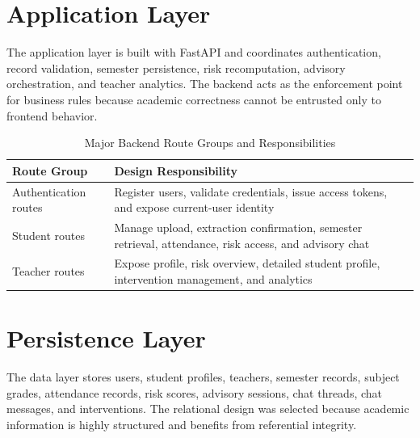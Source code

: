 \section{Application Layer}
The application layer is built with FastAPI and coordinates authentication, record validation, semester persistence, risk recomputation, advisory orchestration, and teacher analytics. The backend acts as the enforcement point for business rules because academic correctness cannot be entrusted only to frontend behavior.

\begin{table}[H]
\centering
\caption{Major Backend Route Groups and Responsibilities}
\begin{tabularx}{\textwidth}{>{\raggedright\arraybackslash}p{} >{\raggedright\arraybackslash}X}
\toprule
\textbf{Route Group} & \textbf{Design Responsibility} \\
\midrule
Authentication routes & Register users, validate credentials, issue access tokens, and expose current-user identity \\
Student routes & Manage upload, extraction confirmation, semester retrieval, attendance, risk access, and advisory chat \\
Teacher routes & Expose profile, risk overview, detailed student profile, intervention management, and analytics \\
\bottomrule
\end{tabularx}
\end{table}

\section{Persistence Layer}
The data layer stores users, student profiles, teachers, semester records, subject grades, attendance records, risk scores, advisory sessions, chat threads, chat messages, and interventions. The relational design was selected because academic information is highly structured and benefits from referential integrity.

